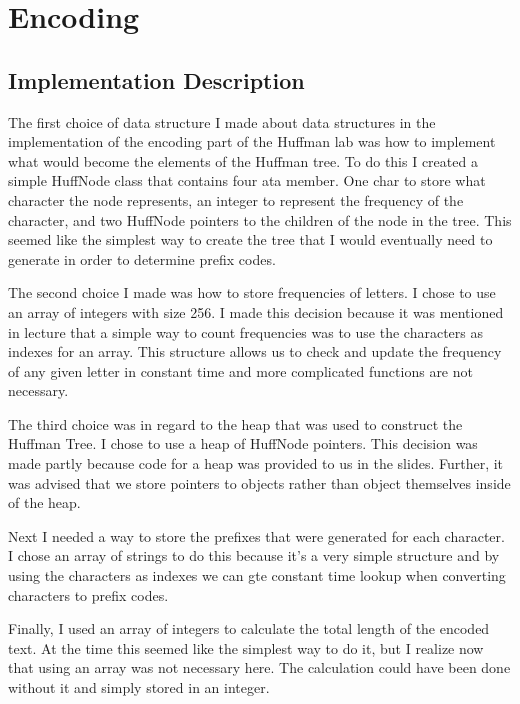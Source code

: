 \documentclass{article}
\begin{document}
\section{Encoding}
\subsection{Implementation Description}
The first choice of data structure I made about data structures in the implementation of the encoding part of the Huffman lab was how to implement what would become the elements of the Huffman tree. To do this I created a simple HuffNode class that contains four ata member. One char to store what character the node represents, an integer to represent the frequency of the character, and two HuffNode pointers to the children of the node in the tree. This seemed like the simplest way to create the tree that I would eventually need to generate in order to determine prefix codes. 

The second choice I made  was how to store frequencies of letters. I chose to use an array of integers with size 256. I made this decision because it was mentioned in lecture that a simple way to count frequencies was to use the characters as indexes for an array. This structure allows us to check and update the frequency of any given letter in constant time and more complicated functions are not necessary.

The third choice was in regard to the heap that was used to construct the Huffman Tree. I chose to use a heap of HuffNode pointers. This decision was made partly because code for a heap was provided to us in the slides. Further, it was advised that we store pointers to objects rather than object themselves inside of the heap.

Next I needed a way to store the prefixes that were generated for each character. I chose an array of strings to do this because it's a very simple structure and by using the characters as indexes we can gte constant time lookup when converting characters to prefix codes. 

Finally, I used an array of integers to calculate the total length of the encoded text. At the time this seemed like the simplest way to do it, but I realize now that using an array was not necessary here. The calculation could have been done without it and simply stored in an integer.
\end{document}

